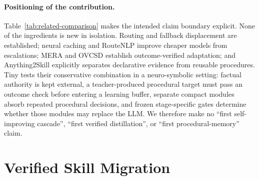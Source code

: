 \documentclass[10pt]{article}
\begin{document}
\paragraph{Positioning of the contribution.}
Table~\ref{tab:related-comparison} makes the intended claim boundary explicit.
None of the ingredients is new in isolation. Routing and fallback displacement
are established; neural caching and RouteNLP improve cheaper models from
escalations; MERA and OVCSD establish outcome-verified adaptation; and
Anything2Skill explicitly separates declarative evidence from reusable
procedures. Tiny tests their conservative combination in a neuro-symbolic
setting: factual authority is kept external, a teacher-produced procedural target
must pass an outcome check before entering a learning buffer, separate compact
modules absorb repeated procedural decisions, and frozen stage-specific gates
determine whether those modules may replace the LLM. We therefore make no
``first self-improving cascade'', ``first verified distillation'', or
``first procedural-memory'' claim.



\section{Verified Skill Migration}
\end{document}
